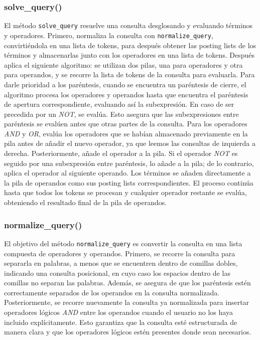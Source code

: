 \documentclass[12pt,a4paper]{article}
\begin{document}
\subsubsection{solve\_query()}
El método \texttt{solve\_query} resuelve una consulta desglosando y evaluando términos y operadores. Primero, normaliza la consulta con \texttt{normalize\_query}, convirtiéndola en una lista de tokens, para después obtener las posting lists de los términos y almacenarlas junto con los operadores en una lista de tokens.
Después aplica el siguiente algoritmo: se utilizan dos pilas, una para operadores y otra para operandos, y se recorre la lista de tokens de la consulta para evaluarla. Para darle prioridad a los paréntesis, cuando se encuentra un paréntesis de cierre, el algoritmo procesa los operadores y operandos hasta que encuentra el paréntesis de apertura correspondiente, evaluando así la subexpresión. En caso de ser precedida por un \textit{NOT}, se evalúa. Esto asegura que las subexpresiones entre paréntesis se evalúen antes que otras partes de la consulta. Para los operadores \textit{AND} y \textit{OR}, evalúa los operadores que se habían almacenado previamente en la pila antes de añadir el nuevo operador, ya que leemos las consultas de izquierda a derecha. Posteriormente, añade el operador a la pila. Si el operador \textit{NOT} es seguido por una subexpresión entre paréntesis, lo añade a la pila; de lo contrario, aplica el operador al siguiente operando. Los términos se añaden directamente a la pila de operandos como sus posting lists correspondientes. El proceso continúa hasta que todos los tokens se procesan y cualquier operador restante se evalúa, obteniendo el resultado final de la pila de operandos.

\subsubsection{normalize\_query()}
El objetivo del método \texttt{normalize\_query} es convertir la consulta en una lista compuesta de operadores y operandos. Primero, se recorre la consulta para separarla en palabras, a menos que se encuentren dentro de comillas dobles, indicando una consulta posicional, en cuyo caso los espacios dentro de las comillas no separan las palabras. Además, se asegura de que los paréntesis estén correctamente separados de los operandos en la consulta normalizada. Posteriormente, se recorre nuevamente la consulta ya normalizada para insertar operadores lógicos \textit{AND} entre los operandos cuando el usuario no los haya incluido explícitamente. Esto garantiza que la consulta esté estructurada de manera clara y que los operadores lógicos estén presentes donde sean necesarios.
\end{document}
